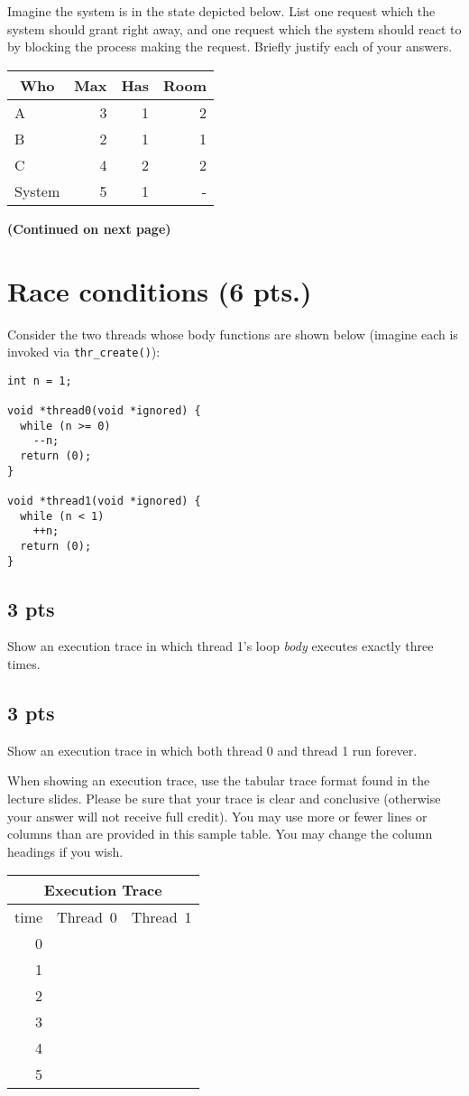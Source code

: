 \documentclass{article}
\def\titledquestion#1#2{\section{ {#1} ({#2} pts.)}}
\begin{document}
Imagine the system is in the state depicted
below.  List one request which the system should grant right
away, and one request which the system should react to by
blocking the process making the request.  Briefly justify
each of your answers.

\begin{tabular}[b]{|l|r|r|r|}
\multicolumn{1}{c}{Who} &
 \multicolumn{1}{c}{Max} &
 \multicolumn{1}{c}{Has} &
 \multicolumn{1}{c}{Room} \\
\hline
A      & 3 & 1 & 2 \\ \hline
B      & 2 & 1 & 1 \\ \hline
C      & 4 & 2 & 2 \\ \hline
System & 5 & 1 & - \\ \hline
\end{tabular}

\vspace{2in}
\begin{center}
{\textbf{(Continued on next page)}}
\end{center}

\clearpage

\titledquestion{Race conditions}{6}

Consider the two threads whose body functions are shown below (imagine
each is invoked via \texttt{thr\_create()}):

\begin{verbatim}
int n = 1;

void *thread0(void *ignored) {
  while (n >= 0)
    --n;
  return (0);
}

void *thread1(void *ignored) {
  while (n < 1)
    ++n;
  return (0);
}

\end{verbatim}

\subsection{3 pts}
Show an execution trace in which thread 1's loop \textit{body}
executes exactly three times.

\subsection{3 pts}
Show an execution trace in which both thread 0 and thread 1
run forever.

When showing an execution trace, use the tabular trace format found in
the lecture slides.
Please be sure that your trace is clear and conclusive
(otherwise your answer will not receive full credit).
You may use more or fewer lines or columns than are provided
in this sample table.
You may change the column headings if you wish.

{\large
\begin{tabular}[b]{|r|c|c|}
\multicolumn{3}{c}{Execution Trace} \\
\hline
time & Thread~0 & Thread~1 \\
\hline
 0 & \hspace{1in} & \hspace{1in} \\
\hline
 1 & & \\
\hline
 2 & & \\
\hline
 3 & & \\
\hline
 4 & & \\
\hline
 5 & & \\
\hline
\end{tabular}
}
\end{document}
